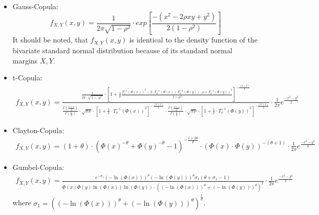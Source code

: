 \documentclass[a4paper]{article}
\begin{document}
\begin{itemize}
	\item Gauss-Copula:  
	\begin{equation}
		f_{X,Y}(x,y)=	\frac{1}{2\pi \sqrt{1-\rho^2}} \cdot exp \left[\frac{-(x^2-2\rho x y+y^2)}{2(1-\rho^2)} \right]
	\end{equation}
	It should be noted, that $f_{X,Y}(x,y)$ is identical to the density function of the bivariate standard normal distribution because of its standard normal margins $X, Y$.
	\item t-Copula:
	\begin{equation}
		\begin{array}{l}
			f_{X,Y}(x,y)=\frac{\frac{1}{2\pi \cdot \sqrt{1-\varrho^2 }}\cdot {\left\lbrack 1+\frac{1}{\nu }\frac{{T_{\nu }^{-1} \left(\Phi \left(x\right)\right)}^2 -2\cdot T_{\nu }^{-1} \left(\Phi \left(x\right)\right){\cdot T}_{\nu }^{-1} \left(\Phi \left(y\right)\right)\cdot \rho +{T_{\nu }^{-1} \left(\Phi \left(y\right)\right)}^2 }{1-\rho^2 }\right\rbrack }^{-\frac{\left(\nu +2\right)}{2}} }{\frac{\Gamma \left(\frac{\nu +1}{2}\right)}{\Gamma \left(\frac{\nu }{2}\right)}\cdot \sqrt{\pi \nu }\cdot {\left\lbrack 1+\frac{1}{\nu }\cdot {T_{\nu }^{-1} \left(\Phi \left(x\right)\right)}^2 \right\rbrack }^{-\frac{\left(\nu +1\right)}{2}} \cdot \frac{\Gamma \left(\frac{\nu +1}{2}\right)}{\Gamma \left(\frac{\nu }{2}\right)}\cdot \sqrt{\pi \nu }\cdot {\left\lbrack 1+\frac{1}{\nu }\cdot {T_{\nu }^{-1} \left(\Phi \left(y\right)\right)}^2 \right\rbrack }^{-\frac{\left(\nu +1\right)}{2}} } \cdot \frac{1}{2\pi}e^{\frac{-x^2-y^2}{2}}
		\end{array}
	\end{equation}
	
	\item Clayton-Copula:
	\begin{equation}
		\begin{array}{l}
			f_{X,Y}(x,y)=\left(1+\theta \right)\cdot {\left({\Phi \left(x\right)}^{-\theta } +{\Phi \left(y\right)}^{-\theta } -1\right)}^{-\frac{1+2\theta }{\theta }} \cdot {\left(\Phi \left(x\right)\cdot \Phi \left(y\right)\right)}^{-\left(\theta +1\right)} \cdot \frac{1}{2\pi }e^{\frac{-x^2-y^2}{2}} 
		\end{array}
	\end{equation}
	
	
	
	\item Gumbel-Copula:
	\begin{equation}
		\begin{array}{l}
			f_{X,Y}(x,y)=\frac{e^{-\sigma_1}  \left(-\ln (\Phi(x))\right)^\theta  \left(-\ln (\Phi(y))\right)^\theta  \sigma_1  (\theta + \sigma_1 -1)}{\Phi(x) \Phi(y) \ln(\Phi(x)) \ln(\Phi(y)) \cdot \left( (-\ln(\Phi(x)))^\theta + (-\ln(\Phi(y)))^\theta \right)^2} \cdot \frac{1}{2\pi }e^{\frac{-x^2-y^2}{2}}  
		\end{array}
	\end{equation}
	\hspace{4cm} where $\sigma_1=\left((-\ln(\Phi(x)))^\theta + (-\ln(\Phi(y)))^\theta \right) ^{\frac{1}{\theta}}$.
	

\end{itemize}
\end{document}
